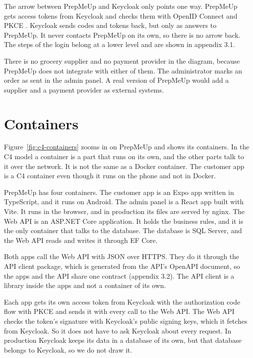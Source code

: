 \documentclass[a4paper,11pt]{article}
\begin{document}
The arrow between PrepMeUp and Keycloak only points one way. PrepMeUp gets access tokens from Keycloak and checks them with OpenID Connect and PKCE \cite{keycloak-securing-apps-oidc}. Keycloak sends codes and tokens back, but only as answers to PrepMeUp. It never contacts PrepMeUp on its own, so there is no arrow back. The steps of the login belong at a lower level and are shown in appendix 3.1.

There is no grocery supplier and no payment provider in the diagram, because PrepMeUp does not integrate with either of them. The administrator marks an order as sent in the admin panel. A real version of PrepMeUp would add a supplier and a payment provider as external systems.

\section{Containers}
Figure~\ref{fig:c4-containers} zooms in on PrepMeUp and shows its containers. In the C4 model a container is a part that runs on its own, and the other parts talk to it over the network. It is not the same as a Docker container. The customer app is a C4 container even though it runs on the phone and not in Docker.


PrepMeUp has four containers. The customer app is an Expo app written in TypeScript, and it runs on Android. The admin panel is a React app built with Vite. It runs in the browser, and in production its files are served by nginx. The Web API is an ASP.NET Core application. It holds the business rules, and it is the only container that talks to the database. The database is SQL Server, and the Web API reads and writes it through EF Core.

Both apps call the Web API with JSON over HTTPS. They do it through the API client package, which is generated from the API's OpenAPI document, so the apps and the API share one contract (appendix 3.2). The API client is a library inside the apps and not a container of its own.

Each app gets its own access token from Keycloak with the authorization code flow with PKCE and sends it with every call to the Web API. The Web API checks the token's signature with Keycloak's public signing keys, which it fetches from Keycloak. So it does not have to ask Keycloak about every request. In production Keycloak keeps its data in a database of its own, but that database belongs to Keycloak, so we do not draw it.

\printbibliography
\end{document}
